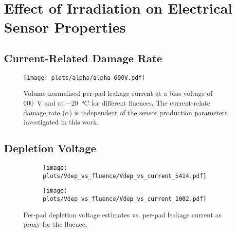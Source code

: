 \section{Effect of Irradiation on Electrical Sensor Properties}
\label{sec:irradiation}

\subsection{Current-Related Damage Rate}
\label{subsec:irradiation_alpha}

\begin{figure}[h]
	\centering
	\texttt{[image: plots/alpha/alpha\_600V.pdf]}
	\label{plot:alpha}
	\caption{
	    Volume-normalised per-pad leakage current at a bias voltage of \SI{600}{\volt} and at \SI{-20}{\celsius} for different fluences.
        The current-relate damage rate ($\alpha$) is independent of the sensor production parameters investigated in this work.
	}
\end{figure}

\subsection{Depletion Voltage}

\begin{figure}
	\captionsetup[subfigure]{aboveskip=-1pt,belowskip=-1pt}
	\centering
	\begin{subfigure}[b]{0.49\textwidth}
		\centering
		\texttt{[image: plots/Vdep\_vs\_fluence/Vdep\_vs\_current\_5414.pdf]}
		\subcaption{
			}
			\label{plot:Vdep_vs_current_5414}
	\end{subfigure}
	\hfill
	\begin{subfigure}[b]{0.49\textwidth}
		\centering
		\texttt{[image: plots/Vdep\_vs\_fluence/Vdep\_vs\_current\_1002.pdf]}
		\subcaption{
		}
		\label{plot:Vdep_vs_current_1002}
	\end{subfigure}	
	\caption{
		Per-pad depletion voltage estimates vs. per-pad leakage current as proxy for the fluence.
	}
\end{figure}

\label{subsec:irradiation_Vdep}
